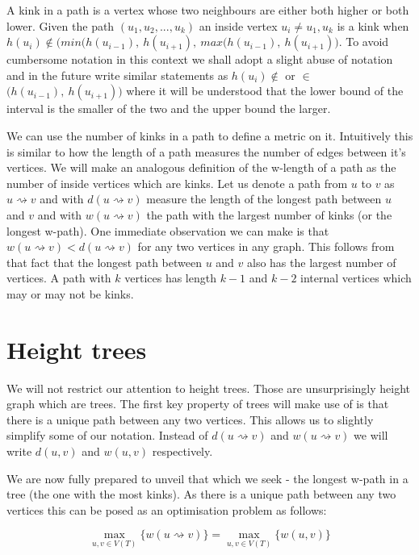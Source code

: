 A kink in a path is a vertex whose two neighbours are either both higher or both lower. Given the path $(u_1, u_2, ... , u_k)$ an inside vertex $u_i \ne u_1, u_k$ is a kink when $h(u_i) \notin \big( min(h(u_{i-1}),~h(u_{i+1}),~max(h(u_{i-1}),~h(u_{i+1}) \big)$. To avoid cumbersome notation in this context we shall adopt a slight abuse of notation and in the future write similar statements as $h(u_i) \notin $ or $ \in $ $\big(h(u_{i-1}),~h(u_{i+1}) \big)$ where it will be understood that the lower bound of the interval is the smaller of the two and the upper bound the larger.

We can use the number of kinks in a path to define a metric on it. Intuitively this is similar to how the length of a path measures the number of edges between it's vertices. We will make an analogous definition of the w-length of a path as the number of inside vertices which are kinks. Let us denote a path from $u$ to $v$ as $u \rightsquigarrow v$ and with $d(u \rightsquigarrow v)$ measure the length of the longest path between $u$ and $v$ and with $w(u \rightsquigarrow v)$ the path with the largest number of kinks (or the longest w-path). One immediate observation we can make is that $w(u \rightsquigarrow v) < d(u \rightsquigarrow v)$ for any two vertices in any graph. This follows from that fact that the longest path between $u$ and $v$ also has the largest number of vertices. A path with $k$ vertices has length $k-1$ and $k-2$ internal vertices which may or may not be kinks.


\section{Height trees}

We will not restrict our attention to height trees. Those are unsurprisingly height graph which are trees. The first key property of trees will make use of is that there is a unique path between any two vertices. This allows us to slightly simplify some of our notation.  Instead of  $d(u \rightsquigarrow v)$ and $w(u \rightsquigarrow v)$ we will write $d(u, v)$ and $w(u, v)$ respectively.  

We are now fully prepared to unveil that which we seek - the longest w-path in a tree (the one with the most kinks). As there is a unique path between any two vertices this can be posed as an optimisation problem as follows:

$$ \max_{u, v \in V(T)}\{ w(u \rightsquigarrow v) \} =  \max_{u, v \in V(T)}\{ w(u, v) \} $$

